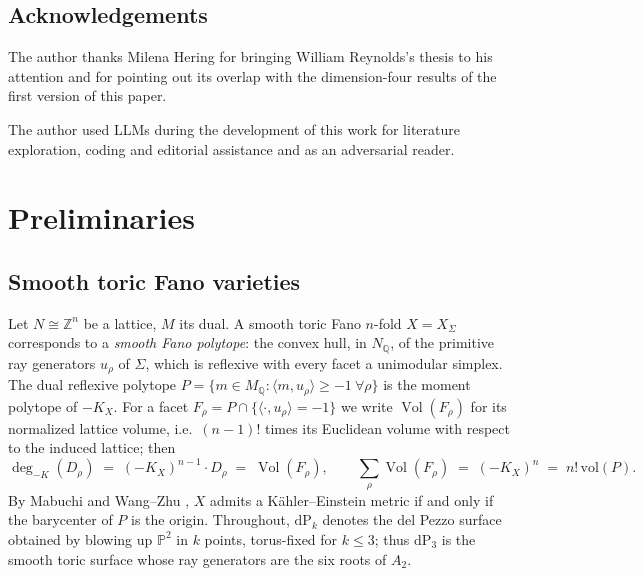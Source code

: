 \documentclass[11pt]{amsart}
\theoremstyle{definition}
\theoremstyle{remark}
\newcommand{\PP}{\mathbb{P}}
\newcommand{\ZZ}{\mathbb{Z}}
\newcommand{\QQ}{\mathbb{Q}}
\newcommand{\dP}{\mathrm{dP}}
\newcommand{\Vol}{\operatorname{Vol}}
\begin{document}
\subsection*{Acknowledgements}
The author thanks Milena Hering for bringing William Reynolds's thesis
\cite{Reynolds2023} to his attention and for pointing out its overlap
with the dimension-four results of the first version of this paper.

The author used LLMs during the development of this work for literature exploration, coding and editorial assistance and as an adversarial reader.


\section{Preliminaries}\label{sec:prelim}

\subsection{Smooth toric Fano varieties}
Let $N \cong \ZZ^n$ be a lattice, $M$ its dual. A smooth toric Fano
$n$-fold $X = X_\Sigma$ corresponds to a \emph{smooth Fano polytope}: the
convex hull, in $N_\QQ$, of the primitive ray generators
$u_\rho$ of $\Sigma$, which is reflexive with every facet a unimodular
simplex. The dual reflexive polytope
$P = \{ m \in M_\QQ : \langle m, u_\rho \rangle \ge -1 \ \forall \rho\}$
is the moment polytope of $-K_X$. For a facet
$F_\rho = P \cap \{ \langle \cdot, u_\rho\rangle = -1\}$ we write
$\Vol(F_\rho)$ for its normalized lattice volume, i.e.\ $(n-1)!$ times
its Euclidean volume with respect to the induced lattice; then
\begin{equation}\label{eq:degrees}
\deg_{-K}(D_\rho) \;=\; (-K_X)^{n-1}\cdot D_\rho \;=\; \Vol(F_\rho),
\qquad
\sum_\rho \Vol(F_\rho) \;=\; (-K_X)^n \;=\; n!\,\mathrm{vol}(P).
\end{equation}
By Mabuchi and Wang--Zhu \cite{Mabuchi1987,WangZhu2004}, $X$ admits a
K\"ahler--Einstein metric if and only if the barycenter of $P$ is the
origin. Throughout, $\dP_k$ denotes the del Pezzo surface obtained by
blowing up $\PP^2$ in $k$ points, torus-fixed for $k \le 3$; thus
$\dP_3$ is the smooth toric surface whose ray generators are the six
roots of $A_2$.
\end{document}
